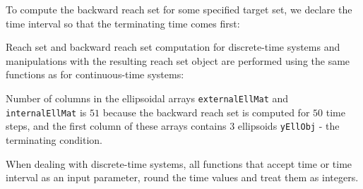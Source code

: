 To compute the backward reach set for some specified target set,
we declare the time interval so that the terminating time comes first:

Reach set and backward reach set computation for discrete-time systems and
manipulations with the resulting reach set object are performed using
the same functions as for continuous-time systems:

Number of columns in the ellipsoidal arrays {\tt externalEllMat} and {\tt internalEllMat} is $51$
because the backward reach set is computed for $50$ time steps, and the first
column of these arrays contains $3$ ellipsoids {\tt yEllObj} - the terminating
condition.

When dealing with discrete-time systems, all functions that accept time or
time interval as an input parameter, round the time values and treat them as
integers.
